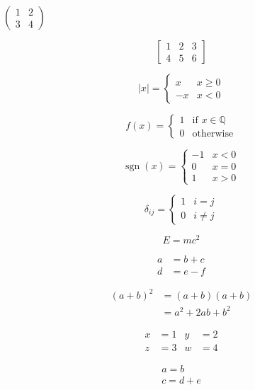 \documentclass{article}
\begin{document}
\par
\newpage
$
\left(\begin{smallmatrix} 1 & 2 \\ 3 & 4 \end{smallmatrix}\right)
$
\par
\newpage
\[
\left[\begin{array}{cc|c} 1 & 2 & 3 \\ 4 & 5 & 6 \end{array}\right]
\]
\par
\newpage
\[
|x| = \begin{cases} x & x \ge 0 \\ -x & x < 0 \end{cases}
\]
\par
\newpage
\[
f(x) = \begin{cases} 1 & \text{if } x \in \mathbb{Q} \\ 0 & \text{otherwise} \end{cases}
\]
\par
\newpage
\[
\operatorname{sgn}(x) = \begin{cases} -1 & x < 0 \\ 0 & x = 0 \\ 1 & x > 0 \end{cases}
\]
\par
\newpage
\[
\delta_{ij} = \begin{cases} 1 & i = j \\ 0 & i \ne j \end{cases}
\]
\par
\newpage
\[
E = mc^2
\]
\par
\newpage
\begin{align*}
a &= b + c \\ d &= e - f
\end{align*}
\par
\newpage
\begin{align*}
(a+b)^2 &= (a+b)(a+b) \\ &= a^2 + 2ab + b^2
\end{align*}
\par
\newpage
\begin{align*}
x &= 1 & y &= 2 \\ z &= 3 & w &= 4
\end{align*}
\par
\newpage
\begin{gather*}
a = b \\ c = d + e
\end{gather*}
\par
\newpage
\end{document}
